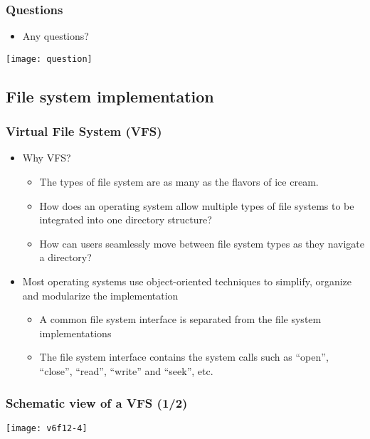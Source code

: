 \documentclass[CJKutf8,dvipsnames,table]{beamer}
\begin{document}
\begin{CJK*}{UTF8}{song}
  \begin{frame}
    \frametitle{Questions}
    \begin{itemize}
    \item Any questions?
    \end{itemize}
    \begin{center}
      \texttt{[image: question]}
    \end{center}
  \end{frame}
  
  \subsection{File system implementation}

  \begin{frame}
    \frametitle{Virtual File System (VFS)} \pause
    \begin{itemize}\parskip=0pt
    \item Why VFS? \pause
      \begin{itemize}\parskip=0pt
      \item The types of file system are as many as the flavors of ice cream. \pause
      \item How does an operating system allow multiple types of file systems to be integrated into one directory structure? \pause
      \item How can users seamlessly move between file system types as they navigate a directory? \pause
      \end{itemize}
    \item Most operating systems use object-oriented techniques to simplify, organize and modularize the implementation \pause
      \begin{itemize}\parskip=0pt
      \item A common file system interface is separated from the file system implementations \pause
      \item The file system interface contains the system calls such as ``open'', ``close'', ``read'', ``write'' and ``seek'', etc.
      \end{itemize}
    \end{itemize}
  \end{frame}
  
  \begin{frame}
    \frametitle{Schematic view of a VFS (1/2)} \pause
    \begin{center}
      \texttt{[image: v6f12-4]}
    \end{center}
  \end{frame}
  

\end{CJK*}
\end{document}
